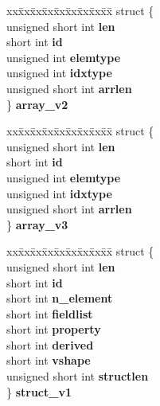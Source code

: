 \begin{DoxyCompactItemize}
\begin{tabbing}
\end{tabbing}\item 
\mbox{\label{unioncodeview__type_ab73b1654988577e68aa3c6784af19e35}} 
\begin{tabbing}
xx\=xx\=xx\=xx\=xx\=xx\=xx\=xx\=xx\=\kill
struct \{\\
\>unsigned short int {\bfseries len}\\
\>short int {\bfseries id}\\
\>unsigned int {\bfseries elemtype}\\
\>unsigned int {\bfseries idxtype}\\
\>unsigned short int {\bfseries arrlen}\\
\} {\bfseries array\_v2}\\

\end{tabbing}\item 
\mbox{\label{unioncodeview__type_a8bceb7491727e042e38689dcd517a118}} 
\begin{tabbing}
xx\=xx\=xx\=xx\=xx\=xx\=xx\=xx\=xx\=\kill
struct \{\\
\>unsigned short int {\bfseries len}\\
\>short int {\bfseries id}\\
\>unsigned int {\bfseries elemtype}\\
\>unsigned int {\bfseries idxtype}\\
\>unsigned short int {\bfseries arrlen}\\
\} {\bfseries array\_v3}\\

\end{tabbing}\item 
\mbox{\label{unioncodeview__type_aa004768225e5b80f131986c7484ac6a4}} 
\begin{tabbing}
xx\=xx\=xx\=xx\=xx\=xx\=xx\=xx\=xx\=\kill
struct \{\\
\>unsigned short int {\bfseries len}\\
\>short int {\bfseries id}\\
\>short int {\bfseries n\_element}\\
\>short int {\bfseries fieldlist}\\
\>short int {\bfseries property}\\
\>short int {\bfseries derived}\\
\>short int {\bfseries vshape}\\
\>unsigned short int {\bfseries structlen}\\
\} {\bfseries struct\_v1}\\


\end{tabbing}
\end{DoxyCompactItemize}
